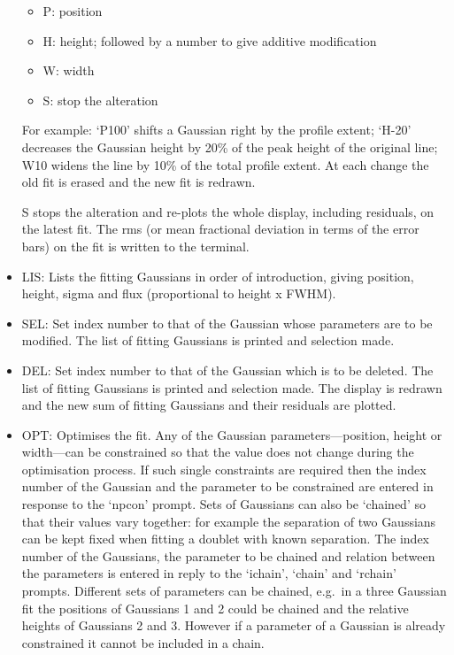 \documentclass[11pt,twoside]{article}
\newcommand{\latorhtm}[2]{#1}
\newcommand{\latorhtm}[2]{#2}
\begin{document}
\begin{itemize}
\begin{itemize}
\item P: position
\item H: height; followed by a number to give additive modification
\item W: width
\item S: stop the alteration
\end{itemize}

   For example: `P100' shifts a Gaussian right by the profile extent;
   `H-20' decreases the Gaussian height by 20\% of the peak height of the
   original line; W10 widens the line by 10\% of the total profile
   extent. At each change the old fit is erased and the new fit is
   redrawn.

   S stops the alteration and re-plots the whole display, including
   residuals, on the latest fit. The rms (or mean fractional deviation
   in terms of the error bars) on the fit is written to the terminal.

\item
   LIS: Lists the fitting Gaussians in order of introduction, giving
   position, height, sigma and flux (proportional to height x FWHM).

\item
   SEL: Set index number to that of the Gaussian whose parameters are
   to be modified. The list of fitting Gaussians is printed and
   selection made.

\item
   DEL: Set index number to that of the Gaussian which is to be deleted.
   The list of fitting Gaussians is printed and selection made. The
   display is redrawn and the new sum of fitting Gaussians and their
   residuals are plotted.

\item
   OPT: Optimises the fit. Any of the Gaussian
   parameters\latorhtm{---}{-}position, height or
   width\latorhtm{---}{-}can be constrained so that the value does not
   change during the optimisation process. If such single constraints
   are required then the index number of the Gaussian and the parameter
   to be constrained are entered in response to the `npcon' prompt. Sets
   of Gaussians can also be `chained' so that their values vary
   together: for example the separation of two Gaussians can be kept
   fixed when fitting a doublet with known separation. The index number
   of the Gaussians, the parameter to be chained and relation between
   the parameters is entered in reply to the `ichain', `chain' and
   `rchain' prompts. Different sets of parameters can be chained, e.g.\
   in a three Gaussian fit the positions of Gaussians 1 and 2 could be
   chained and the relative heights of Gaussians 2 and 3.  However if a
   parameter of a Gaussian is already constrained it cannot be included
   in a chain.


\end{itemize}
\end{document}
